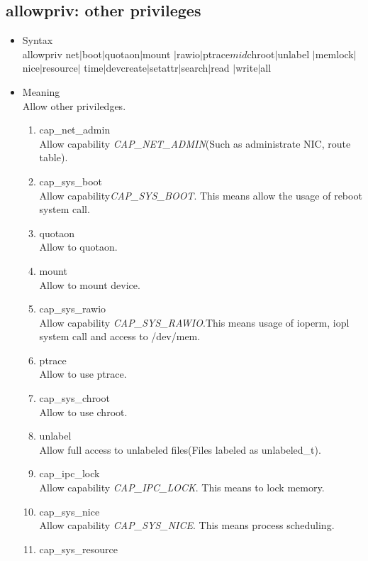 \documentclass{article}
\begin{document}
\subsection{allowpriv: other privileges}
\begin{itemize}
 \item Syntax\\
       allowpriv  net$\mid$boot$\mid$quotaon$\mid$mount
       $\mid$rawio$\mid$ptrace$mid$chroot$\mid$unlabel
       $\mid$memlock$\mid$nice$\mid$resource$\mid$
       time$\mid$devcreate$\mid$setattr$\mid$search$\mid$read
       $\mid$write$\mid$all
 \item Meaning\\
       Allow other priviledges.
       \begin{enumerate}
	\item cap\_net\_admin\\
	      Allow capability {\it CAP\_NET\_ADMIN}(Such as 
	      administrate NIC, route table). 
	\item cap\_sys\_boot\\
	      Allow capability{\it CAP\_SYS\_BOOT}. This means allow the
	      usage of reboot system call.
	\item quotaon\\         
	      Allow to quotaon.
	\item mount\\         
	      Allow to mount device.
	\item cap\_sys\_rawio\\        
	      Allow capability {\it CAP\_SYS\_RAWIO}.This means usage of
	      ioperm, iopl system call and access to /dev/mem.
	\item ptrace\\ 
	      Allow to use ptrace.
	\item cap\_sys\_chroot\\
	      Allow to use chroot.
	\item unlabel\\
	      Allow full access to unlabeled files(Files labeled as
	      unlabeled\_t).
	\item cap\_ipc\_lock\\ 
	      Allow capability {\it CAP\_IPC\_LOCK}. This means to lock
	      memory.
	\item cap\_sys\_nice\\
	      Allow capability {\it CAP\_SYS\_NICE}. This means process scheduling.
	\item cap\_sys\_resource\\

\end{enumerate}
\end{itemize}
\end{document}
